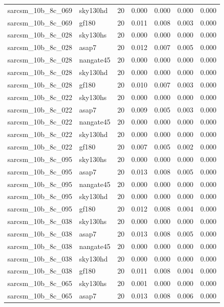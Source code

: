 \begin{tabular}{llrrrrr}
sarcsm\_10b\_8c\_069 & sky130hd & 20 & 0.000 & 0.000 & 0.000 & 0.000 \\
sarcsm\_10b\_8c\_069 & gf180 & 20 & 0.011 & 0.008 & 0.003 & 0.000 \\
sarcsm\_10b\_8c\_028 & sky130hs & 20 & 0.000 & 0.000 & 0.000 & 0.000 \\
sarcsm\_10b\_8c\_028 & asap7 & 20 & 0.012 & 0.007 & 0.005 & 0.000 \\
sarcsm\_10b\_8c\_028 & nangate45 & 20 & 0.000 & 0.000 & 0.000 & 0.000 \\
sarcsm\_10b\_8c\_028 & sky130hd & 20 & 0.000 & 0.000 & 0.000 & 0.000 \\
sarcsm\_10b\_8c\_028 & gf180 & 20 & 0.010 & 0.007 & 0.003 & 0.000 \\
sarcsm\_10b\_8c\_022 & sky130hs & 20 & 0.000 & 0.000 & 0.000 & 0.000 \\
sarcsm\_10b\_8c\_022 & asap7 & 20 & 0.009 & 0.005 & 0.003 & 0.000 \\
sarcsm\_10b\_8c\_022 & nangate45 & 20 & 0.000 & 0.000 & 0.000 & 0.000 \\
sarcsm\_10b\_8c\_022 & sky130hd & 20 & 0.000 & 0.000 & 0.000 & 0.000 \\
sarcsm\_10b\_8c\_022 & gf180 & 20 & 0.007 & 0.005 & 0.002 & 0.000 \\
sarcsm\_10b\_8c\_095 & sky130hs & 20 & 0.000 & 0.000 & 0.000 & 0.000 \\
sarcsm\_10b\_8c\_095 & asap7 & 20 & 0.013 & 0.008 & 0.005 & 0.000 \\
sarcsm\_10b\_8c\_095 & nangate45 & 20 & 0.000 & 0.000 & 0.000 & 0.000 \\
sarcsm\_10b\_8c\_095 & sky130hd & 20 & 0.000 & 0.000 & 0.000 & 0.000 \\
sarcsm\_10b\_8c\_095 & gf180 & 20 & 0.012 & 0.008 & 0.004 & 0.000 \\
sarcsm\_10b\_8c\_038 & sky130hs & 20 & 0.000 & 0.000 & 0.000 & 0.000 \\
sarcsm\_10b\_8c\_038 & asap7 & 20 & 0.013 & 0.008 & 0.005 & 0.000 \\
sarcsm\_10b\_8c\_038 & nangate45 & 20 & 0.000 & 0.000 & 0.000 & 0.000 \\
sarcsm\_10b\_8c\_038 & sky130hd & 20 & 0.000 & 0.000 & 0.000 & 0.000 \\
sarcsm\_10b\_8c\_038 & gf180 & 20 & 0.011 & 0.008 & 0.004 & 0.000 \\
sarcsm\_10b\_8c\_065 & sky130hs & 20 & 0.001 & 0.000 & 0.000 & 0.000 \\
sarcsm\_10b\_8c\_065 & asap7 & 20 & 0.013 & 0.008 & 0.006 & 0.000 \\

\end{tabular}
